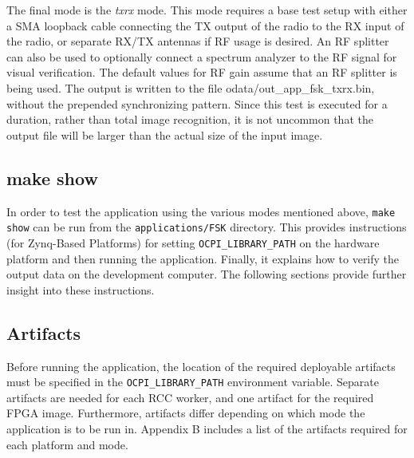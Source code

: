 \noindent The final mode is the \textit{txrx} mode. This mode requires a base test setup with either a SMA loopback cable connecting the TX output of the radio to the RX input of the radio, or separate RX/TX antennas if RF usage is desired. An RF splitter can also be used to optionally connect a spectrum analyzer to the RF signal for visual verification. The default values for RF gain assume that an RF splitter is being used. The output is written to the file odata/out\_app\_fsk\_txrx.bin, without the prepended synchronizing pattern. Since this test is executed for a duration, rather than total image recognition, it is not uncommon that the output file will be larger than the actual size of the input image.
\par\medskip
\subsection{make show}
In order to test the application using the various modes mentioned above, \texttt{make show} can be run from the \texttt{applications/FSK} directory. This provides instructions (for Zynq-Based Platforms) for setting \texttt{OCPI\_LIBRARY\_PATH} on the hardware platform and then running the application. Finally, it explains how to verify the output data on the development computer. The following sections provide further insight into these instructions.
\subsection{Artifacts}
Before running the application, the location of the required deployable artifacts must be specified in the \texttt{OCPI\_LIBRARY\_PATH} environment variable. Separate artifacts are needed for each RCC worker, and one artifact for the required FPGA image. Furthermore, artifacts differ depending on which mode the application is to be run in. Appendix B includes a list of the artifacts required for each platform and mode.
